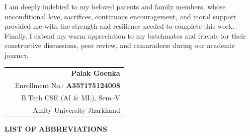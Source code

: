 \documentclass[12pt,a4paper,oneside]{report}
\begin{document}
I am deeply indebted to my beloved parents and family members, whose unconditional love, sacrifices, continuous encouragement, and moral support provided me with the strength and resilience needed to complete this work. Finally, I extend my warm appreciation to my batchmates and friends for their constructive discussions, peer review, and camaraderie during our academic journey.

\vspace{2.5cm}

\noindent
\begin{tabularx}{\textwidth}{Xr}
& \textbf{Palak Goenka} \\
& Enrollment No.: \textbf{A357175124008} \\
& B.Tech CSE (AI \& ML), Sem--V \\
& Amity University Jharkhand
\end{tabularx}

\clearpage

\tableofcontents
\clearpage

\listoffigures
\clearpage

\listoftables
\clearpage

\thispagestyle{plain}
\begin{center}
    {\Large \textbf{LIST OF ABBREVIATIONS}}\\[0.8cm]
\end{center}
\end{document}
